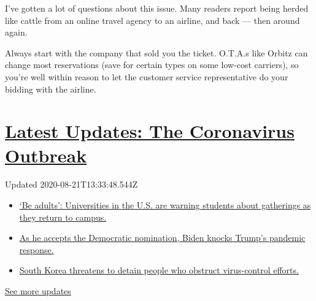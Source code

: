 I've gotten a lot of questions about this issue. Many readers report
being herded like cattle from an online travel agency to an airline, and
back --- then around again.

Always start with the company that sold you the ticket. O.T.A.s like
Orbitz can change most reservations (save for certain types on some
low-cost carriers), so you're well within reason to let the customer
service representative do your bidding with the airline.

\hypertarget{latest-updates-the-coronavirus-outbreak}{%
\section{\texorpdfstring{\href{https://www.nytimes3xbfgragh.onion/2020/08/21/world/covid-19-coronavirus.html?action=click\&pgtype=Article\&state=default\&region=MAIN_CONTENT_1\&context=storylines_live_updates}{Latest
Updates: The Coronavirus
Outbreak}}{Latest Updates: The Coronavirus Outbreak}}\label{latest-updates-the-coronavirus-outbreak}}

Updated 2020-08-21T13:33:48.544Z

\begin{itemize}
\tightlist
\item
  \href{https://www.nytimes3xbfgragh.onion/2020/08/21/world/covid-19-coronavirus.html?action=click\&pgtype=Article\&state=default\&region=MAIN_CONTENT_1\&context=storylines_live_updates\#link-6a60a19d}{`Be
  adults': Universities in the U.S. are warning students about
  gatherings as they return to campus.}
\item
  \href{https://www.nytimes3xbfgragh.onion/2020/08/21/world/covid-19-coronavirus.html?action=click\&pgtype=Article\&state=default\&region=MAIN_CONTENT_1\&context=storylines_live_updates\#link-324af071}{As
  he accepts the Democratic nomination, Biden knocks Trump's pandemic
  response.}
\item
  \href{https://www.nytimes3xbfgragh.onion/2020/08/21/world/covid-19-coronavirus.html?action=click\&pgtype=Article\&state=default\&region=MAIN_CONTENT_1\&context=storylines_live_updates\#link-191d44be}{South
  Korea threatens to detain people who obstruct virus-control efforts.}
\end{itemize}

\href{https://www.nytimes3xbfgragh.onion/2020/08/21/world/covid-19-coronavirus.html?action=click\&pgtype=Article\&state=default\&region=MAIN_CONTENT_1\&context=storylines_live_updates}{See
more updates}

